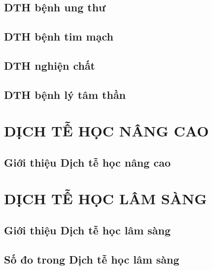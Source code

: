 \documentclass[
]{book}
\begin{document}
\hypertarget{dthbkl_ungthu}{%
\chapter{DTH bệnh ung thư}\label{dthbkl_ungthu}}

\hypertarget{dthbkl_timmach}{%
\chapter{DTH bệnh tim mạch}\label{dthbkl_timmach}}

\hypertarget{dthbkl_nghienchat}{%
\chapter{DTH nghiện chất}\label{dthbkl_nghienchat}}

\hypertarget{dthbkl_sktt}{%
\chapter{DTH bệnh lý tâm thần}\label{dthbkl_sktt}}

\hypertarget{part-dux1ecbch-tux1ec5-hux1ecdc-nuxe2ng-cao}{%
\part{DỊCH TỄ HỌC NÂNG CAO}\label{part-dux1ecbch-tux1ec5-hux1ecdc-nuxe2ng-cao}}

\hypertarget{dthnc_gioithieu}{%
\chapter{Giới thiệu Dịch tễ học nâng cao}\label{dthnc_gioithieu}}

\hypertarget{part-dux1ecbch-tux1ec5-hux1ecdc-luxe2m-suxe0ng}{%
\part{DỊCH TỄ HỌC LÂM SÀNG}\label{part-dux1ecbch-tux1ec5-hux1ecdc-luxe2m-suxe0ng}}

\hypertarget{dthls_gioithieu}{%
\chapter{Giới thiệu Dịch tễ học lâm sàng}\label{dthls_gioithieu}}

\hypertarget{dthls_sodo}{%
\chapter{Số đo trong Dịch tễ học lâm sàng}\label{dthls_sodo}}
\end{document}
